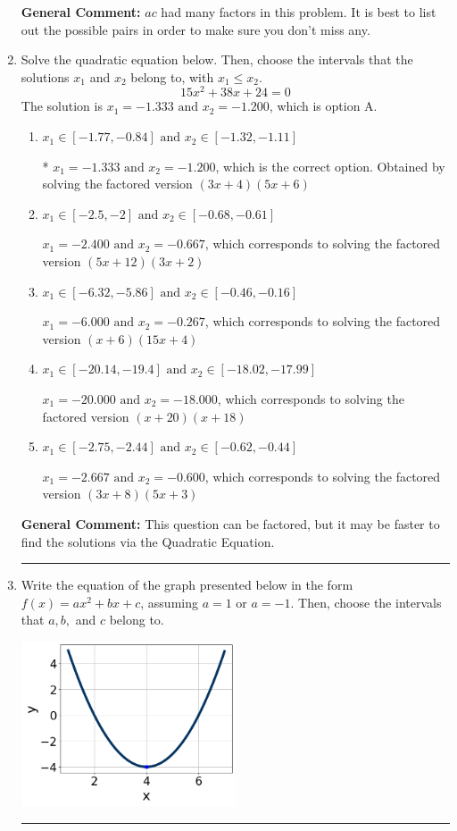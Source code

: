 \documentclass{extbook}[14pt]
\newcommand{\litem}[1]{\item #1

\rule{\textwidth}{0.4pt}}
\begin{document}
\begin{enumerate}
{\textbf{General Comment:} $ac$ had many factors in this problem. It is best to list out the possible pairs in order to make sure you don't miss any.
}
\litem{
Solve the quadratic equation below. Then, choose the intervals that the solutions $x_1$ and $x_2$ belong to, with $x_1 \leq x_2$.
\[ 15x^{2} +38 x + 24 = 0 \]The solution is \( x_1 = -1.333 \text{ and } x_2 = -1.200 \), which is option A.\begin{enumerate}[label=\Alph*.]
\item \( x_1 \in [-1.77, -0.84] \text{ and } x_2 \in [-1.32, -1.11] \)

* $x_1 = -1.333 \text{ and } x_2 = -1.200$, which is the correct option. Obtained by solving the factored version $(3x + 4)(5x + 6)$
\item \( x_1 \in [-2.5, -2] \text{ and } x_2 \in [-0.68, -0.61] \)

$x_1 = -2.400 \text{ and } x_2 = -0.667$, which corresponds to solving the factored version $(5x + 12)(3x + 2)$
\item \( x_1 \in [-6.32, -5.86] \text{ and } x_2 \in [-0.46, -0.16] \)

$x_1 = -6.000 \text{ and } x_2 = -0.267$, which corresponds to solving the factored version $(x + 6)(15x + 4)$
\item \( x_1 \in [-20.14, -19.4] \text{ and } x_2 \in [-18.02, -17.99] \)

$x_1 = -20.000 \text{ and } x_2 = -18.000$, which corresponds to solving the factored version $(x + 20)(x + 18)$
\item \( x_1 \in [-2.75, -2.44] \text{ and } x_2 \in [-0.62, -0.44] \)

$x_1 = -2.667 \text{ and } x_2 = -0.600$, which corresponds to solving the factored version $(3x + 8)(5x + 3)$
\end{enumerate}

\textbf{General Comment:} This question can be factored, but it may be faster to find the solutions via the Quadratic Equation.
}
\litem{
Write the equation of the graph presented below in the form $f(x)=ax^2+bx+c$, assuming  $a=1$ or $a=-1$. Then, choose the intervals that $a, b,$ and $c$ belong to.

\begin{center}
    \includegraphics[width=0.5\textwidth]{../Figures/quadraticGraphToEquationCopyB.png}
\end{center}


}
\end{enumerate}
\end{document}
